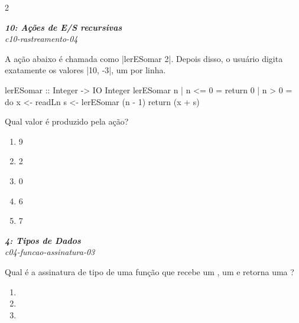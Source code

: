 \documentclass[a4paper,10pt,brazil]{article}
\begin{document}
\begin{multicols}{2}
\begin{enumerate}
\end{enumerate}

\begin{flushright}
  \footnotesize
  \textit{\textbf{10: Ações de E/S recursivas}}\\
  \textit{c10-rastreamento-04}\\

\end{flushright}
A ação abaixo é chamada como \haskellinline|lerESomar 2|. Depois disso, o usuário digita exatamente os valores \haskellinline|10, -3|, um por linha.

\begin{haskellcode}
lerESomar :: Integer -> IO Integer
lerESomar n
  | n <= 0 = return 0
  | n > 0  = do
      x <- readLn
      s <- lerESomar (n - 1)
      return (x + s)
\end{haskellcode}

Qual valor é produzido pela ação?

\begin{enumerate}
  \item 9

  \item 2

  \item 0

  \item 6

  \item 7


\end{enumerate}

\begin{flushright}
  \footnotesize
  \textit{\textbf{4: Tipos de Dados}}\\
  \textit{c04-funcao-assinatura-03}\\

\end{flushright}
Qual é a assinatura de tipo de uma função que recebe um , um  e retorna uma ?

\begin{enumerate}
  \item {}

  \item {}

  \item {}


\end{enumerate}
\end{multicols}
\end{document}
